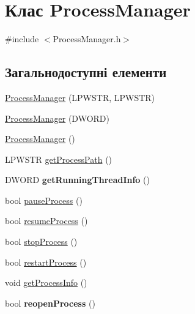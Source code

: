 \hypertarget{class_process_manager}{\section{Клас Process\+Manager}
\label{class_process_manager}
}


{\ttfamily \#include $<$Process\+Manager.\+h$>$}

\subsection*{Загальнодоступні елементи}
\begin{DoxyCompactItemize}
\item 
\hyperlink{class_process_manager_aeb235e3509127e76fbc1f9c525603120}{Process\+Manager} (L\+P\+W\+S\+T\+R, L\+P\+W\+S\+T\+R)
\item 
\hyperlink{class_process_manager_a37ddbc730a38922c9b7a0dafb0b7ab55}{Process\+Manager} (D\+W\+O\+R\+D)
\item 
\hyperlink{class_process_manager_a41b83a8ef0a801ca3aee9a3d82568ac1}{Process\+Manager} ()
\item 
L\+P\+W\+S\+T\+R \hyperlink{class_process_manager_a8c5aa33cb2a82c784ff2fcef6d44b9c0}{get\+Process\+Path} ()
\item 
\hypertarget{class_process_manager_a0ad5c900976a56f7b2ebc0c12f52cbaf}{D\+W\+O\+R\+D {\bfseries get\+Running\+Thread\+Info} ()}\label{class_process_manager_a0ad5c900976a56f7b2ebc0c12f52cbaf}

\item 
bool \hyperlink{class_process_manager_a271267c549451c89be3a85948f6220d2}{pause\+Process} ()
\item 
bool \hyperlink{class_process_manager_a397a4518985e698014f1177c49456627}{resume\+Process} ()
\item 
bool \hyperlink{class_process_manager_a98a33242eded5ec7098c58ca5382d0a8}{stop\+Process} ()
\item 
bool \hyperlink{class_process_manager_a2c3cb2ec54bbec48d5ec6cea66b3eef6}{restart\+Process} ()
\item 
void \hyperlink{class_process_manager_a44dcace533e34ae32b1b87f869027b69}{get\+Process\+Info} ()
\item 
\hypertarget{class_process_manager_a892aec6660bcb53b59bc643301339244}{bool {\bfseries reopen\+Process} ()}\label{class_process_manager_a892aec6660bcb53b59bc643301339244}


\end{DoxyCompactItemize}
